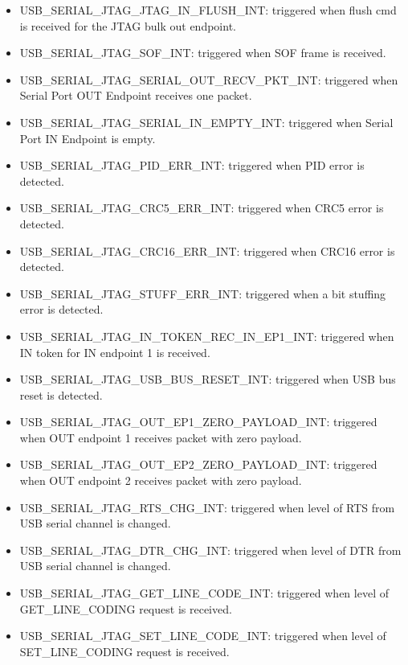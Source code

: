 \documentclass[main\_\_EN.tex]{subfiles}
\begin{document}
\begin{itemize}
\item \label{int:USBSERIALJTAGJTAGINFLUSHINT}USB\_SERIAL\_JTAG\_JTAG\_IN\_FLUSH\_INT: triggered when flush cmd is received for the JTAG bulk out endpoint.
\item \label{int:USBSERIALJTAGSOFINT}USB\_SERIAL\_JTAG\_SOF\_INT: triggered when SOF frame is received.
\item \label{int:USBSERIALJTAGSERIALOUTRECVPKTINT}USB\_SERIAL\_JTAG\_SERIAL\_OUT\_RECV\_PKT\_INT: triggered when Serial Port OUT Endpoint receives one packet.
\item \label{int:USBSERIALJTAGSERIALINEMPTYINT}USB\_SERIAL\_JTAG\_SERIAL\_IN\_EMPTY\_INT: triggered when Serial Port IN Endpoint is empty.
\item \label{int:USBSERIALJTAGPIDERRINT}USB\_SERIAL\_JTAG\_PID\_ERR\_INT: triggered when PID error is detected.
\item \label{int:USBSERIALJTAGCRC5ERRINT}USB\_SERIAL\_JTAG\_CRC5\_ERR\_INT: triggered when CRC5 error is detected.
\item \label{int:USBSERIALJTAGCRC16ERRINT}USB\_SERIAL\_JTAG\_CRC16\_ERR\_INT: triggered when CRC16 error is detected.
\item \label{int:USBSERIALJTAGSTUFFERRINT}USB\_SERIAL\_JTAG\_STUFF\_ERR\_INT: triggered when a bit stuffing error is detected.
\item \label{int:USBSERIALJTAGINTOKENRECINEP1INT}USB\_SERIAL\_JTAG\_IN\_TOKEN\_REC\_IN\_EP1\_INT: triggered when IN token for IN endpoint 1 is received.
\item \label{int:USBSERIALJTAGUSBBUSRESETINT}USB\_SERIAL\_JTAG\_USB\_BUS\_RESET\_INT: triggered when USB bus reset is detected.
\item \label{int:USBSERIALJTAGOUTEP1ZEROPAYLOADINT}USB\_SERIAL\_JTAG\_OUT\_EP1\_ZERO\_PAYLOAD\_INT: triggered when OUT endpoint 1 receives packet with zero payload.
\item \label{int:USBSERIALJTAGOUTEP2ZEROPAYLOADINT}USB\_SERIAL\_JTAG\_OUT\_EP2\_ZERO\_PAYLOAD\_INT: triggered when OUT endpoint 2 receives packet with zero payload.
\item \label{int:USBSERIALJTAGRTSCHGINT}USB\_SERIAL\_JTAG\_RTS\_CHG\_INT: triggered when level of RTS from USB serial channel is changed.
\item \label{int:USBSERIALJTAGDTRCHGINT}USB\_SERIAL\_JTAG\_DTR\_CHG\_INT: triggered when level of DTR from USB serial channel is changed.
\item \label{int:USBSERIALJTAGGETLINECODEINT}USB\_SERIAL\_JTAG\_GET\_LINE\_CODE\_INT: triggered when level of GET\_LINE\_CODING request is received.
\item \label{int:USBSERIALJTAGSETLINECODEINT}USB\_SERIAL\_JTAG\_SET\_LINE\_CODE\_INT: triggered when level of SET\_LINE\_CODING request is received.
\end{itemize}
\end{document}
